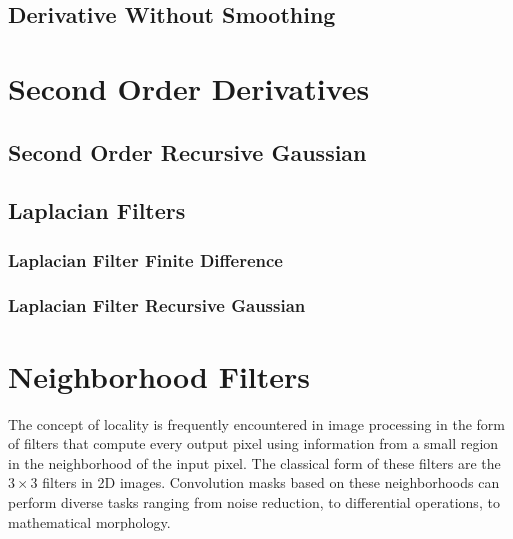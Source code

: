 \subsection{Derivative Without Smoothing}
\label{sec:DerivativeImageFilter}

\ifitkFullVersion

\fi


\section{Second Order Derivatives}
\label{sec:SecondOrderDerivatives}


\subsection{Second Order Recursive Gaussian}
\label{sec:SecondDerivativeRecursiveGaussian}

\ifitkFullVersion

\fi


\subsection{Laplacian Filters}
\label{sec:LaplacianFilters}

\subsubsection{Laplacian Filter Finite Difference}
\subsubsection{Laplacian Filter Recursive Gaussian}
\ifitkFullVersion


\fi



\section{Neighborhood Filters}
\label{sec:NeighborhoodFilters}

The concept of locality is frequently encountered in image processing in the
form of filters that compute every output pixel using information from a small
region in the neighborhood of the input pixel.  The classical form of
these filters are the $3 \times 3$ filters in 2D images. Convolution masks
based on these neighborhoods can perform diverse tasks ranging from noise
reduction, to differential operations, to mathematical morphology.

